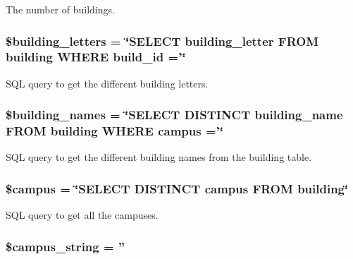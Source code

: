 \-The number of buildings. \hypertarget{admin__view_2index_8php_ab7c3ef21f41bcddbed5d1f3b591342da}{
\subsubsection[{\$building\-\_\-letters}]{\setlength{\rightskip}{0pt plus 5cm}\$building\-\_\-letters = \char`\"{}\-S\-E\-L\-E\-C\-T building\-\_\-letter \-F\-R\-O\-M building \-W\-H\-E\-R\-E build\-\_\-id ='\char`\"{}}}\label{admin__view_2index_8php_ab7c3ef21f41bcddbed5d1f3b591342da}
\-S\-Q\-L query to get the different building letters. \hypertarget{admin__view_2index_8php_a8ab55fcf525cc50064165d5b3e77e9a5}{
\subsubsection[{\$building\-\_\-names}]{\setlength{\rightskip}{0pt plus 5cm}\$building\-\_\-names = \char`\"{}\-S\-E\-L\-E\-C\-T \-D\-I\-S\-T\-I\-N\-C\-T building\-\_\-name \-F\-R\-O\-M building \-W\-H\-E\-R\-E campus ='\char`\"{}}}\label{admin__view_2index_8php_a8ab55fcf525cc50064165d5b3e77e9a5}
\-S\-Q\-L query to get the different building names from the building table. \hypertarget{admin__view_2index_8php_a6f0655994f3941d6ab50f681032f899b}{
\subsubsection[{\$campus}]{\setlength{\rightskip}{0pt plus 5cm}\$campus = \char`\"{}\-S\-E\-L\-E\-C\-T \-D\-I\-S\-T\-I\-N\-C\-T campus \-F\-R\-O\-M building\char`\"{}}}\label{admin__view_2index_8php_a6f0655994f3941d6ab50f681032f899b}
\-S\-Q\-L query to get all the campuses. \hypertarget{admin__view_2index_8php_a9cbaf35082f8edc5439404467c593e5a}{
\subsubsection[{\$campus\-\_\-string}]{\setlength{\rightskip}{0pt plus 5cm}\$campus\-\_\-string = ''}}\label{admin__view_2index_8php_a9cbaf35082f8edc5439404467c593e5a}
